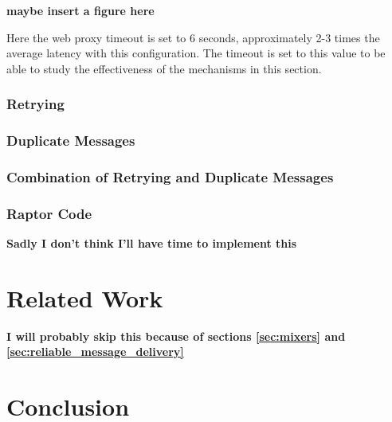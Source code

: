 \documentclass[a4paper,11pt,oneside]{report}
\begin{document}
\textbf{maybe insert a figure here}

Here the web proxy timeout is set to 6 seconds, approximately 2-3 times the average latency with this configuration. The timeout is set to this value to be able to study the effectiveness of the mechanisms in this section.
\subsection{Retrying}

\subsection{Duplicate Messages}

\subsection{Combination of Retrying and Duplicate Messages}

\subsection{Raptor Code}
\textbf{Sadly I don't think I'll have time to implement this}

\chapter{Related Work}



\textbf{I will probably skip this because of sections \autoref{sec:mixers} and \autoref{sec:reliable_message_delivery}}

\chapter{Conclusion}

\end{document}
